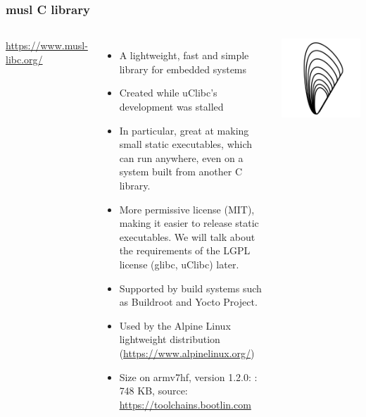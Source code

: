 \begin{frame}
  \frametitle{musl C library}
  \begin{columns}
      \url{https://www.musl-libc.org/}
      \begin{itemize}
      \item A lightweight, fast and simple library for embedded systems
      \item Created while uClibc's development was stalled
      \item In particular, great at making small static executables,
	    which can run anywhere, even on a system built
            from another C library.
      \item More permissive license (MIT), making it easier to release
            static executables. We will talk about the requirements
            of the LGPL license (glibc, uClibc) later.
      \item Supported by build systems such as Buildroot and Yocto
        Project.
      \item Used by the Alpine Linux lightweight distribution
        (\url{https://www.alpinelinux.org/})
      \item Size on armv7hf, version 1.2.0:
        : 748 KB, source: \url{https://toolchains.bootlin.com}
      \end{itemize}
    \includegraphics[width=\textwidth]{slides/boot-time-c-libraries/musl.png}
  \end{columns}
\end{frame}

